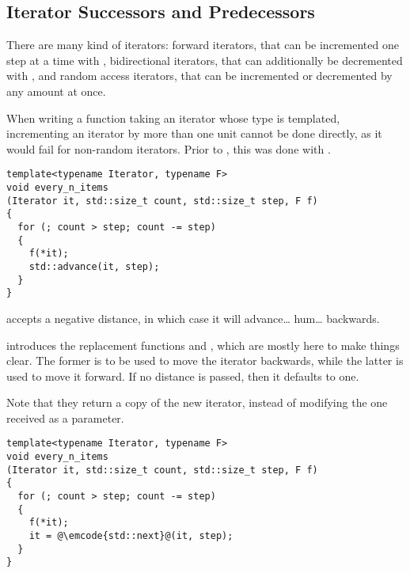 \subsection{Iterator Successors and Predecessors}

There are many kind of iterators: forward iterators, that can be
incremented one step at a time with , bidirectional
iterators, that can additionally be decremented with
, and random access iterators, that can be
incremented or decremented by any amount at once.

When writing a function taking an iterator whose type is templated,
incrementing an iterator by more than one unit cannot be done
directly, as it would fail for non-random iterators. Prior to ,
this was done with .

\begin{lstlisting}
template<typename Iterator, typename F>
void every_n_items
(Iterator it, std::size_t count, std::size_t step, F f)
{
  for (; count > step; count -= step)
  {
    f(*it);
    std::advance(it, step);
  }
}
\end{lstlisting}

 accepts a negative distance, in which case it
will advance… hum… backwards.

 introduces the replacement functions  and
, which are mostly here to make things clear. The
former is to be used to move the iterator backwards, while the latter
is used to move it forward. If no distance is passed, then it defaults
to one.

Note that they return a copy of the new iterator, instead of modifying
the one received as a parameter.

\begin{lstlisting}
template<typename Iterator, typename F>
void every_n_items
(Iterator it, std::size_t count, std::size_t step, F f)
{
  for (; count > step; count -= step)
  {
    f(*it);
    it = @\emcode{std::next}@(it, step);
  }
}
\end{lstlisting}
